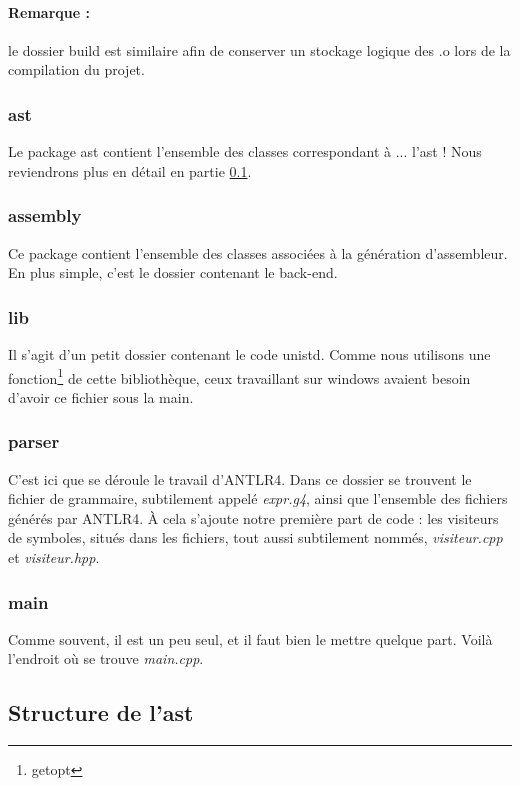 \documentclass{report}
\begin{document}
\paragraph{Remarque :} le dossier build est similaire afin de conserver un stockage logique des .o lors de la compilation du projet.

\subsubsection{ast}
Le package ast contient l'ensemble des classes correspondant à ... l'ast ! Nous reviendrons plus en détail en partie \ref{subsec:Ast}.

\subsubsection{assembly}

Ce package contient l'ensemble des classes associées à la génération d'assembleur. En plus simple, c'est le dossier contenant le back-end.

\subsubsection{lib}

Il s'agit d'un petit dossier contenant le code unistd. Comme nous utilisons une fonction\footnote{getopt} de cette bibliothèque, ceux travaillant sur windows avaient besoin d'avoir ce fichier sous la main.

\subsubsection{parser}

C'est ici que se déroule le travail d'ANTLR4. Dans ce dossier se trouvent le fichier de grammaire, subtilement appelé \emph{expr.g4}, ainsi que l'ensemble des fichiers générés par ANTLR4. À cela s'ajoute notre première part de code : les visiteurs de symboles, situés dans les fichiers, tout aussi subtilement nommés, \emph{visiteur.cpp} et \emph{visiteur.hpp}.

\subsubsection{main}

Comme souvent, il est un peu seul, et il faut bien le mettre quelque part. Voilà l'endroit où se trouve \emph{main.cpp}. 

\subsection{Structure de l'ast}
\label{subsec:Ast}
\end{document}
